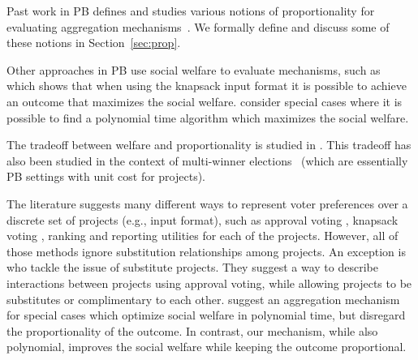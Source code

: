 \documentclass[runningheads]{llncs}
\begin{document}
Past work in PB defines and studies various notions of proportionality for evaluating aggregation mechanisms~\cite{peters2020proportional, fain2016core, fain2018fair, aziz2017proportionally, aziz2017justified, sanchez2016proportional, skowron2020participatory}. We formally define and discuss some of these notions in Section~\ref{sec:prop}.

Other approaches in PB use  social welfare to evaluate mechanisms, such as  ~\citet{goel2019knapsack} which shows that when using the  knapsack input format  it is possible to achieve an outcome that maximizes the social welfare.
 \citet{jain2020participatory} consider special cases where it is possible to find a polynomial time algorithm which maximizes the social welfare. 

The tradeoff between welfare and proportionality is studied in \cite{michorzewski2020price}. %
This tradeoff has also been studied in the context of multi-winner elections~\cite{skowron2018proportionality}
(which are essentially  PB settings with unit cost for projects).

The literature suggests many different ways to 
represent voter preferences over a discrete set of projects (e.g., input format), such as approval voting \cite{aziz2020participatory, aziz2017proportionally}, knapsack voting \cite{goel2019knapsack, goel2016knapsack}, 
ranking \cite{benade2020preference}
and reporting utilities \cite{peters2020proportional} for each of the projects. However, all of those methods ignore substitution relationships  among projects. %
An exception is \citet{jain2020participatory, jain2021partition} who tackle the issue of substitute projects. They suggest a way to describe  interactions between projects using approval voting, while allowing 
projects to be  substitutes  or complimentary to each other. 
\citet{jain2020participatory}  suggest an aggregation mechanism for special cases which  optimize social welfare in polynomial time, but disregard    the proportionality of the outcome. In contrast, our mechanism, while 
also polynomial,    improves the social welfare while keeping the outcome proportional. 
\end{document}
